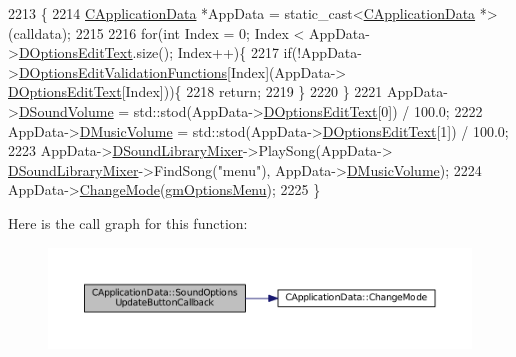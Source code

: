 \begin{DoxyCode}
2213                                                                      \{
2214     \hyperlink{classCApplicationData}{CApplicationData} *AppData = \textcolor{keyword}{static\_cast<}\hyperlink{classCApplicationData}{CApplicationData} *\textcolor{keyword}{>}(calldata);
2215     
2216     \textcolor{keywordflow}{for}(\textcolor{keywordtype}{int} Index = 0; Index < AppData->\hyperlink{classCApplicationData_a7044dc34cbd9d6776e8ef79eb12b5ce4}{DOptionsEditText}.size(); Index++)\{
2217         \textcolor{keywordflow}{if}(!AppData->\hyperlink{classCApplicationData_ab76fa444142de66fdb058f390e01112c}{DOptionsEditValidationFunctions}[Index](AppData->
      \hyperlink{classCApplicationData_a7044dc34cbd9d6776e8ef79eb12b5ce4}{DOptionsEditText}[Index]))\{
2218             \textcolor{keywordflow}{return};   
2219         \}
2220     \}
2221     AppData->\hyperlink{classCApplicationData_aa6e540f860dcb1929ef36ddce3be3691}{DSoundVolume} = std::stod(AppData->\hyperlink{classCApplicationData_a7044dc34cbd9d6776e8ef79eb12b5ce4}{DOptionsEditText}[0]) / 100.0;
2222     AppData->\hyperlink{classCApplicationData_a8bc61af4a83a667102e55cca2a739c3b}{DMusicVolume} = std::stod(AppData->\hyperlink{classCApplicationData_a7044dc34cbd9d6776e8ef79eb12b5ce4}{DOptionsEditText}[1]) / 100.0;
2223     AppData->\hyperlink{classCApplicationData_aa1e6876121bb4fb229ec6b930a8a6766}{DSoundLibraryMixer}->PlaySong(AppData->
      \hyperlink{classCApplicationData_aa1e6876121bb4fb229ec6b930a8a6766}{DSoundLibraryMixer}->FindSong(\textcolor{stringliteral}{"menu"}), AppData->\hyperlink{classCApplicationData_a8bc61af4a83a667102e55cca2a739c3b}{DMusicVolume});   
2224     AppData->\hyperlink{classCApplicationData_aee18c113e9a0acb3cad3d63eb19de71b}{ChangeMode}(\hyperlink{classCApplicationData_ac8ac37a4c8bb871036fbbdc6a072e403a81d2e5abad73eae4325b5ee0cc69fa3e}{gmOptionsMenu});
2225 \}
\end{DoxyCode}
Here is the call graph for this function\+:\nopagebreak
\begin{figure}[H]
\begin{center}
\leavevmode
\includegraphics[width=350pt]{classCApplicationData_ae63c8ca19ddeb92a3aaf0a5d67d09e58_cgraph}
\end{center}
\end{figure}
